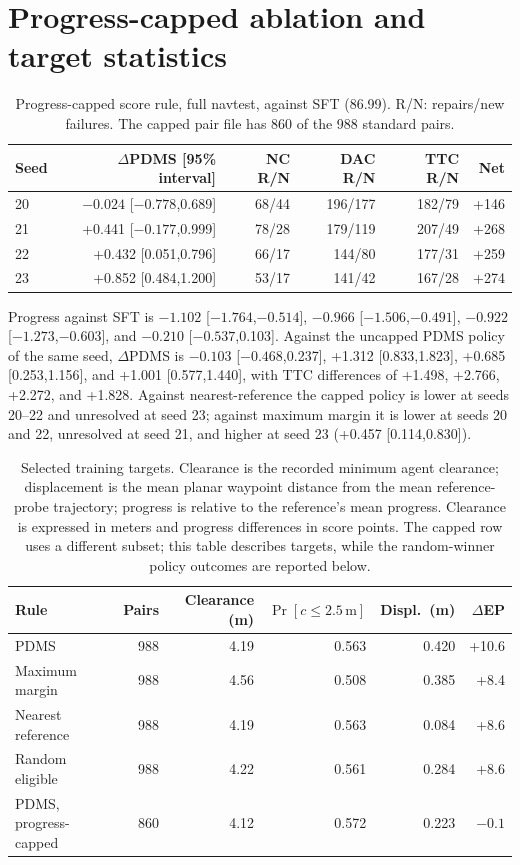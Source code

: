 \documentclass[10pt,letterpaper]{article}
\begin{document}
\section{Progress-capped ablation and target statistics}
\begin{table}[H]
\centering\caption{Progress-capped score rule, full navtest, against SFT (86.99). R/N: repairs/new failures. The capped pair file has 860 of the 988 standard pairs.}
\small\setlength{\tabcolsep}{3pt}
\begin{tabular}{lrrrrr}\toprule
Seed & $\Delta$PDMS [95\% interval] & NC R/N & DAC R/N & TTC R/N & Net\\\midrule
20 & $-0.024$ [$-0.778$,0.689] & 68/44 & 196/177 & 182/79 & +146\\
21 & +0.441 [$-0.177$,0.999] & 78/28 & 179/119 & 207/49 & +268\\
22 & +0.432 [0.051,0.796] & 66/17 & 144/80 & 177/31 & +259\\
23 & +0.852 [0.484,1.200] & 53/17 & 141/42 & 167/28 & +274\\\bottomrule
\end{tabular}
\end{table}
Progress against SFT is $-1.102$ [$-1.764$,$-0.514$], $-0.966$ [$-1.506$,$-0.491$], $-0.922$ [$-1.273$,$-0.603$], and $-0.210$ [$-0.537$,0.103]. Against the uncapped PDMS policy of the same seed, $\Delta$PDMS is $-0.103$ [$-0.468$,0.237], +1.312 [0.833,1.823], +0.685 [0.253,1.156], and +1.001 [0.577,1.440], with TTC differences of +1.498, +2.766, +2.272, and +1.828. Against nearest-reference the capped policy is lower at seeds 20--22 and unresolved at seed 23; against maximum margin it is lower at seeds 20 and 22, unresolved at seed 21, and higher at seed 23 (+0.457 [0.114,0.830]).

\begin{table}[H]
\centering\caption{Selected training targets. Clearance is the recorded minimum agent clearance; displacement is the mean planar waypoint distance from the mean reference-probe trajectory; progress is relative to the reference's mean progress. Clearance is expressed in meters and progress differences in score points. The capped row uses a different subset; this table describes targets, while the random-winner policy outcomes are reported below.}
\small\setlength{\tabcolsep}{3pt}
\begin{tabular}{lrrrrr}\toprule
Rule & Pairs & Clearance (m) & $\Pr[c\le 2.5\,\mathrm m]$ & Displ.\ (m) & $\Delta$EP\\\midrule
PDMS & 988 & 4.19 & 0.563 & 0.420 & +10.6\\
Maximum margin & 988 & 4.56 & 0.508 & 0.385 & +8.4\\
Nearest reference & 988 & 4.19 & 0.563 & 0.084 & +8.6\\
Random eligible & 988 & 4.22 & 0.561 & 0.284 & +8.6\\
PDMS, progress-capped & 860 & 4.12 & 0.572 & 0.223 & $-0.1$\\\bottomrule
\end{tabular}
\end{table}
\end{document}
